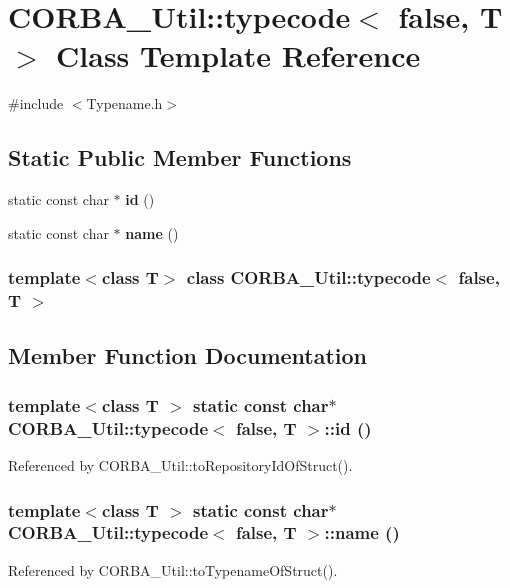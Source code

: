 \section{CORBA\_\-Util::typecode$<$ false, T $>$ Class Template Reference}
\label{classCORBA__Util_1_1typecode_3_01false_00_01T_01_4}


{\ttfamily \#include $<$Typename.h$>$}

\subsection*{Static Public Member Functions}
\begin{DoxyCompactItemize}
\item 
static const char $\ast$ {\bf id} ()
\item 
static const char $\ast$ {\bf name} ()
\end{DoxyCompactItemize}
\subsubsection*{template$<$class T$>$ class CORBA\_\-Util::typecode$<$ false, T $>$}



\subsection{Member Function Documentation}
\subsubsection[{id}]{\setlength{\rightskip}{0pt plus 5cm}template$<$class T $>$ static const char$\ast$ CORBA\_\-Util::typecode$<$ false, T $>$::id ()\hspace{0.3cm}{\ttfamily  [inline, static]}}\label{classCORBA__Util_1_1typecode_3_01false_00_01T_01_4_a48449b3825b809de7434edd450e69878}


Referenced by CORBA\_\-Util::toRepositoryIdOfStruct().

\subsubsection[{name}]{\setlength{\rightskip}{0pt plus 5cm}template$<$class T $>$ static const char$\ast$ CORBA\_\-Util::typecode$<$ false, T $>$::name ()\hspace{0.3cm}{\ttfamily  [inline, static]}}\label{classCORBA__Util_1_1typecode_3_01false_00_01T_01_4_a07d95d95e8e2acf0364ddb0e83865403}


Referenced by CORBA\_\-Util::toTypenameOfStruct().

